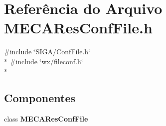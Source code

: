 \section{Referência do Arquivo M\+E\+C\+A\+Res\+Conf\+File.\+h}
\label{_m_e_c_a_res_conf_file_8h}
{\ttfamily \#include \char`\"{}S\+I\+G\+A/\+Conf\+File.\+h\char`\"{}}\\*
{\ttfamily \#include \char`\"{}wx/fileconf.\+h\char`\"{}}\\*
\subsection*{Componentes}
\begin{DoxyCompactItemize}
\item 
class {\bf M\+E\+C\+A\+Res\+Conf\+File}
\end{DoxyCompactItemize}

